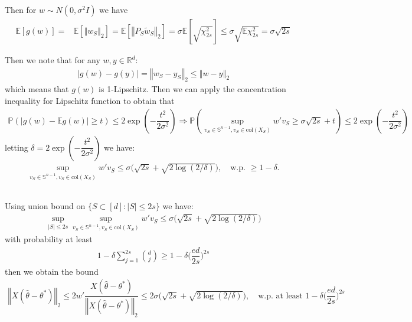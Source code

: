 \documentclass[11pt,a4paper]{article}
\numberwithin{equation}{section}%
\begin{document}
Then for $ w\sim N(0,\sigma ^2I) $ we have 
\begin{align*}
    \mathbb{E}\left[ g(w) \right] = & \mathbb{E}\left[ \left\Vert w_S \right\Vert _2 \right] = \mathbb{E}\left[ \left\Vert P_S\tilde{w}_S \right\Vert _2 \right]  = \sigma \mathbb{E}\left[ \sqrt{\chi^2_{2s}}  \right]  \leq \sigma \sqrt{\mathbb{E}\chi^2_{2s}}= \sigma \sqrt{2s}
\end{align*}


Then we note that for any $ w,y \in \mathbb{R}^d $:
\begin{align*}
    \left\vert g(w)-g(y) \right\vert =\left\Vert w_S-y_S \right\Vert _2 \leq \left\Vert w-y \right\Vert _2
\end{align*}
which means that $ g(w) $ is 1-Lipschitz. Then we can apply the concentration inequality for Lipschitz function to obtain that 
\begin{align*}
    \mathbb{P}\left( \left\vert g(w) -\mathbb{E}g(w) \right\vert \geq t \right) \leq 2\exp\left( -\dfrac{ t^2 }{ 2\sigma ^2 }  \right)
     \Rightarrow \mathbb{P}\left( \mathop{ \sup  }\limits_{v_S\in \mathbb{S}^{n-1}, v_S\in \mathrm{ col  } (X_S)} w'v_S \geq \sigma \sqrt{2s} + t \right) \leq 2\exp\left( -\dfrac{ t^2 }{ 2\sigma ^2 }  \right)
\end{align*}
letting $ \delta  = 2\exp\left( -\dfrac{ t^2 }{ 2\sigma ^2 }  \right) $ we have:
\begin{align*}
    \mathop{ \sup  }\limits_{v_S\in \mathbb{S}^{n-1}, v_S\in \mathrm{ col  } (X_S)} w'v_S \leq \sigma \bigl( \sqrt{2s} + \sqrt{2\log (2/\delta )} \bigr),\quad \text{w.p. } \geq 1-\delta .
\end{align*}


\subsection{}
Using union bound on $ \{S\subset [d]: \left\vert S  \right\vert \leq 2s\} $ we have:
\begin{align*}
    \mathop{ \sup  }\limits_{\left\vert S  \right\vert \leq 2s }\mathop{ \sup  }\limits_{v_S\in \mathbb{S}^{n-1}, v_S\in \mathrm{ col  } (X_S)} w'v_S \leq \sigma \bigl( \sqrt{2s} + \sqrt{2\log (2/\delta )} \bigr)
\end{align*}
with probability at least 
\begin{align*}
    1- \delta \sum_{j=1}^{2s} \binom{d}{j} \geq 1- \delta \bigl(\dfrac{ ed }{ 2s } \bigr)^{2s}
\end{align*}
then we obtain the bound
\begin{align*}
    \left\Vert X(\hat{\theta }-\theta ^*) \right\Vert _2 \leq 2w'\dfrac{ X(\hat{\theta }-\theta ^*)  }{ \left\Vert X(\hat{\theta }-\theta ^*) \right\Vert _2 } \leq 2\sigma \bigl( \sqrt{2s} + \sqrt{2\log (2/\delta )} \bigr)  ,\quad \text{w.p. at least } 1- \delta \bigl(\dfrac{ ed }{ 2s } \bigr)^{2s}
\end{align*}
\end{document}

